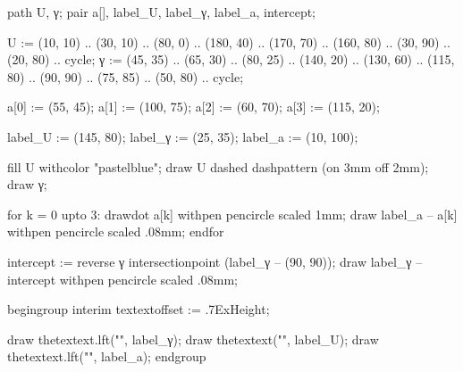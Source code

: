 \startenvironment[images]

\environment[colors]

  path U, γ;
  pair a[], label_U, label_γ, label_a, intercept;

  U := (10, 10) .. (30, 10) .. (80, 0) .. (180, 40) .. (170, 70) .. (160, 80)
    .. (30, 90) .. (20, 80) .. cycle;
  γ := (45, 35) .. (65, 30) .. (80, 25) .. (140, 20) .. (130, 60) .. (115, 80)
    .. (90, 90) .. (75, 85) .. (50, 80) .. cycle;

  a[0] := (55, 45);
  a[1] := (100, 75);
  a[2] := (60, 70);
  a[3] := (115, 20);

  label_U := (145, 80);
  label_γ := (25, 35);
  label_a := (10, 100);

  fill U withcolor "pastelblue";
  draw U dashed dashpattern (on 3mm off 2mm);
  draw γ;

  for k = 0 upto 3:
    drawdot a[k] withpen pencircle scaled 1mm;
    draw label_a -- a[k] withpen pencircle scaled .08mm;
  endfor

  intercept := reverse γ intersectionpoint (label_γ -- (90, 90));
  draw label_γ -- intercept withpen pencircle scaled .08mm;

  begingroup
    interim textextoffset := .7ExHeight;

    draw thetextext.lft("", label_γ);
    draw thetextext("", label_U);
    draw thetextext.lft("", label_a);
  endgroup
\stopuseMPgraphic

\stopenvironment
